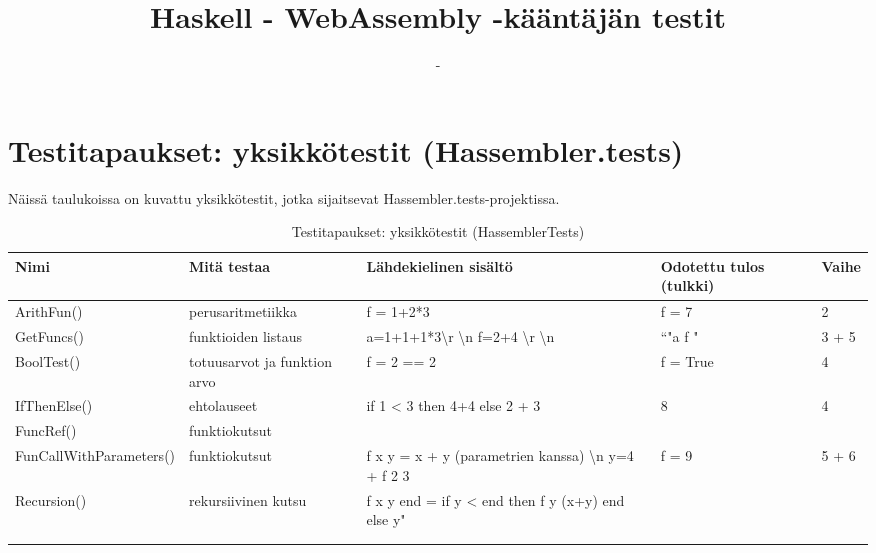 \documentclass[11pt]{article} %
\title{Haskell - WebAssembly -kääntäjän testit}
\author{-}
\begin{document}
\maketitle


\section{Testitapaukset: yksikkötestit (Hassembler.tests)}

Näissä taulukoissa on kuvattu yksikkötestit, jotka sijaitsevat Hassembler.tests-projektissa.

\begin{table}[!htbp] %
\caption{Testitapaukset: yksikkötestit (HassemblerTests)}
\begin{tabular}{|p{3cm}|p{}|p{4cm}|p{3cm}|p{3cm}|}
\hline
\textbf{Nimi} & \textbf{Mitä testaa} & \textbf{Lähdekielinen sisältö} & \textbf{Odotettu tulos (tulkki)}  & \textbf{Vaihe} \\ \hline
 ArithFun()             & perus\-aritmetiikka         & f = 1+2*3   & f = 7                                  &  2              \\ \hline
 GetFuncs()             & funktioiden listaus   & a=1+1+1*3\textbackslash r \textbackslash n f=2+4 \textbackslash r \textbackslash n                     &  ``"a f "         &   3 + 5                                                \\ \hline
 BoolTest()    & totuusarvot ja funktion arvo  & f = 2 == 2   &  f = True         & 4    \\ \hline
 IfThenElse()    & ehtolauseet                & if 1 < 3 then 4+4 else 2 + 3   &  8         & 4    \\ \hline
 FuncRef()  & funktiokutsut      &                       &           &                                                   \\ \hline
 FunCallWith\-Parameters()   &  funktiokutsut &  f x y = x + y (parametrien kanssa) \textbackslash n   y=4 + f 2 3     & f = 9        &  5 + 6             \\ \hline
 Recursion()   & rekursiivinen kutsu      &  f x y end = if y < end then f y (x+y) end else y"    &           &                                                  \\ \hline
              &                      &                       &           &                                                   \\ \hline
              &                      &                       &           &                                                   \\ \hline
              
             
\end{tabular}
\end{table}
\end{document}
